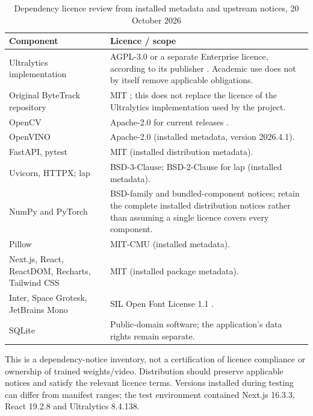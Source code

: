 \begin{longtable}{P{0.32\textwidth}P{0.55\textwidth}}
\caption{Dependency licence review from installed metadata and upstream notices, 20 October 2026}\\
\toprule
Component & Licence / scope\\
\midrule
\endhead
Ultralytics implementation & AGPL-3.0 or a separate Enterprise licence, according to its publisher \cite{ultralyticsLicense}. Academic use does not by itself remove applicable obligations.\\
Original ByteTrack repository & MIT \cite{bytetrackLicense}; this does not replace the licence of the Ultralytics implementation used by the project.\\
OpenCV & Apache-2.0 for current releases \cite{opencvLicense}.\\
OpenVINO & Apache-2.0 (installed metadata, version 2026.4.1).\\
FastAPI, pytest & MIT (installed distribution metadata).\\
Uvicorn, HTTPX; lap & BSD-3-Clause; BSD-2-Clause for lap (installed metadata).\\
NumPy and PyTorch & BSD-family and bundled-component notices; retain the complete installed distribution notices rather than assuming a single licence covers every component.\\
Pillow & MIT-CMU (installed metadata).\\
Next.js, React, ReactDOM, Recharts, Tailwind CSS & MIT (installed package metadata).\\
Inter, Space Grotesk, JetBrains Mono & SIL Open Font License 1.1 \cite{interLicense,spaceGroteskLicense,jetbrainsMonoLicense}.\\
SQLite & Public-domain software; the application's data rights remain separate.\\
\bottomrule
\end{longtable}
This is a dependency-notice inventory, not a certification of licence compliance or ownership of trained weights/video. Distribution should preserve applicable notices and satisfy the relevant licence terms. Versions installed during testing can differ from manifest ranges; the test environment contained Next.js 16.3.3, React 19.2.8 and Ultralytics 8.4.138.

